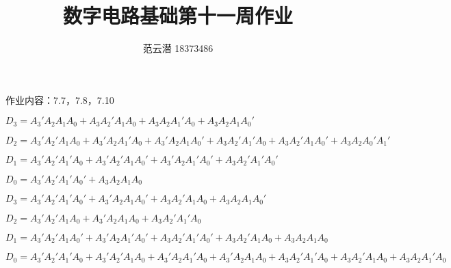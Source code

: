 \documentclass[lang=cn,11pt,a4paper,cite=authoryear]{elegantpaper}
\title{数字电路基础\quad 第十一周作业}
\author{范云潜 18373486}
\institute{微电子学院 184111 班}
\date{\zhtoday}
\begin{document}
\maketitle

作业内容：7.7，7.8，7.10


\(D_3 = A_3'A_2A_1A_0 + A_3A_2'A_1A_0 + A_3A_2A_1'A_0 + A_3A_2A_1A_0'\) 

\(D_2 = A_3' A_2' A_1 A_0 + A_3'A_2A_1'A_0 + A_3' A_2 A_1 A_0' + A_3 A_2' A_1' A_0 + A_3 A_2' A_1 A_0 ' + A_3 A_2 A_0' A_1'\) 

\(D_1 = A_3'A_2'A_1'A_0 + A_3'A_2'A_1A_0' + A_3' A_2 A_1' A_0' + A_3 A_2' A_1' A_0'\)

\(D_0 = A_3' A_2' A_1' A_0' + A_3 A_2 A_1 A_0\)



\(D_3 = A_3'A_2'A_1'A_0' + A_3'A_2A_1A_0' + A_3A_2'A_1A_0 + A_3A_2A_1A_0'\)

\(D_2 = A_3' A_2'A_1A_0 + A_3'A_2A_1A_0 + A_3A_2'A_1'A_0\) 

\(D_1 = A_3'A_2'A_1A_0' + A_3'A_2A_1'A_0' + A_3A_2'A_1'A_0' + A_3A_2'A_1A_0 + A_3A_2A_1A_0\) 

\(D_0 = A_3' A_2' A_1' A_0 + A_3'A_2'A_1A_0 + A_3' A_2A_1'A_0 + A_3'A_2A_1A_0 + A_3A_2'A_1'A_0 + A_3A_2'A_1A_0 + A_3A_2A_1'A_0\)






\end{document}
